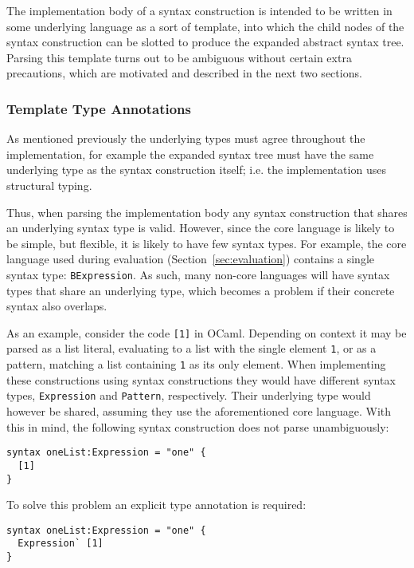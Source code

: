 \documentclass{kththesis}
\begin{document}
The implementation body of a syntax construction is intended to be written in some underlying language as a sort of template, into which the child nodes of the syntax construction can be slotted to produce the expanded abstract syntax tree. Parsing this template turns out to be ambiguous without certain extra precautions, which are motivated and described in the next two sections.

\subsubsection{Template Type Annotations}

As mentioned previously the underlying types must agree throughout the implementation, for example the expanded syntax tree must have the same underlying type as the syntax construction itself; i.e. the implementation uses structural typing.

Thus, when parsing the implementation body any syntax construction that shares an underlying syntax type is valid. However, since the core language is likely to be simple, but flexible, it is likely to have few syntax types. For example, the core language used during evaluation (Section~\ref{sec:evaluation}) contains a single syntax type: \texttt{BExpression}. As such, many non-core languages will have syntax types that share an underlying type, which becomes a problem if their concrete syntax also overlaps.

As an example, consider the code \texttt{[1]} in OCaml. Depending on context it may be parsed as a list literal, evaluating to a list with the single element \texttt{1}, or as a pattern, matching a list containing \texttt{1} as its only element. When implementing these constructions using syntax constructions they would have different syntax types, \texttt{Expression} and \texttt{Pattern}, respectively. Their underlying type would however be shared, assuming they use the aforementioned core language. With this in mind, the following syntax construction does not parse unambiguously:

\begin{verbatim}
syntax oneList:Expression = "one" {
  [1]
}
\end{verbatim}

To solve this problem an explicit type annotation is required:

\begin{verbatim}
syntax oneList:Expression = "one" {
  Expression` [1]
}
\end{verbatim}
\end{document}
